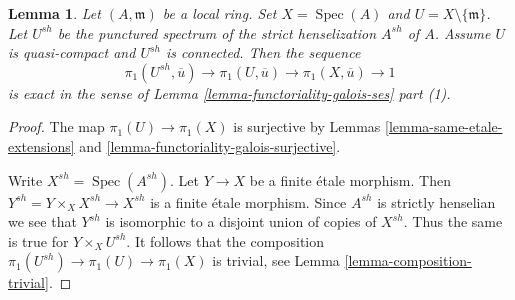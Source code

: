 \documentclass{stacks-project}
\theoremstyle{plain}
\newtheorem{lemma}[subsection]{Lemma}
\theoremstyle{definition}
\theoremstyle{remark}
\numberwithin{equation}{subsection}
\def\Spec{\mathop{\mathrm{Spec}}}
\begin{document}
\begin{lemma}
\label{lemma-local-exact-sequence}
Let $(A, \mathfrak m)$ be a local ring. Set $X = \Spec(A)$ and
$U = X \setminus \{\mathfrak m\}$. Let $U^{sh}$ be the punctured spectrum
of the strict henselization $A^{sh}$ of $A$.
Assume $U$ is quasi-compact and $U^{sh}$ is connected. Then the sequence
$$
\pi_1(U^{sh}, \overline{u}) \to \pi_1(U, \overline{u}) \to
\pi_1(X, \overline{u}) \to 1
$$
is exact in the sense of Lemma \ref{lemma-functoriality-galois-ses} part (1).
\end{lemma}

\begin{proof}
The map $\pi_1(U) \to \pi_1(X)$ is surjective by
Lemmas \ref{lemma-same-etale-extensions} and
\ref{lemma-functoriality-galois-surjective}.

\medskip\noindent
Write $X^{sh} = \Spec(A^{sh})$. Let $Y \to X$ be a finite \'etale morphism.
Then $Y^{sh} = Y \times_X X^{sh} \to X^{sh}$ is a finite \'etale morphism.
Since $A^{sh}$ is strictly henselian we see that $Y^{sh}$ is isomorphic
to a disjoint union of copies of $X^{sh}$. Thus the same is true for
$Y \times_X U^{sh}$. It follows that the composition
$\pi_1(U^{sh}) \to \pi_1(U) \to \pi_1(X)$ is trivial, see
Lemma \ref{lemma-composition-trivial}.


\end{proof}
\end{document}
